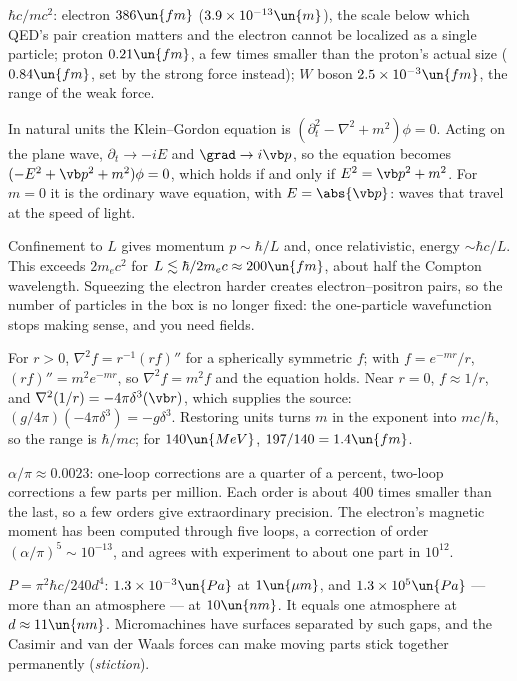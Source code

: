 
 $\hbar c/mc^2$: electron $386\un{fm}$ ($3.9\times10^{-13}\un{m}$), the scale below which QED's pair creation matters and the electron cannot be localized as a single particle; proton $0.21\un{fm}$, a few times smaller than the proton's actual size ($0.84\un{fm}$, set by the strong force instead); $W$ boson $2.5\times10^{-3}\un{fm}$, the range of the weak force.

 In natural units the Klein--Gordon equation is $(\partial_t^2 - \nabla^2 + m^2)\phi = 0$. Acting on the plane wave, $\partial_t\to-iE$ and $\grad\to i\vb p$, so the equation becomes $(-E^2 + \vb p^2 + m^2)\phi = 0$, which holds if and only if $E^2 = \vb p^2+m^2$. For $m = 0$ it is the ordinary wave equation, with $E = \abs{\vb p}$: waves that travel at the speed of light.

 Confinement to $L$ gives momentum $p\sim\hbar/L$ and, once relativistic, energy $\sim\hbar c/L$. This exceeds $2m_ec^2$ for $L\lesssim\hbar/2m_ec\approx200\un{fm}$, about half the Compton wavelength. Squeezing the electron harder creates electron--positron pairs, so the number of particles in the box is no longer fixed: the one-particle wavefunction stops making sense, and you need fields.

 For $r>0$, $\nabla^2f = r^{-1}(rf)''$ for a spherically symmetric $f$; with $f = e^{-mr}/r$, $(rf)'' = m^2e^{-mr}$, so $\nabla^2f = m^2f$ and the equation holds. Near $r = 0$, $f\approx1/r$, and $\nabla^2(1/r) = -4\pi\delta^3(\vb r)$, which supplies the source: $(g/4\pi)(-4\pi\delta^3) = -g\delta^3$. Restoring units turns $m$ in the exponent into $mc/\hbar$, so the range is $\hbar/mc$; for $140\un{MeV}$, $197/140 = 1.4\un{fm}$.

 $\alpha/\pi\approx0.0023$: one-loop corrections are a quarter of a percent, two-loop corrections a few parts per million. Each order is about $400$ times smaller than the last, so a few orders give extraordinary precision. The electron's magnetic moment has been computed through five loops, a correction of order $(\alpha/\pi)^5\sim10^{-13}$, and agrees with experiment to about one part in $10^{12}$.

 $P = \pi^2\hbar c/240d^4$: $1.3\times10^{-3}\un{Pa}$ at $1\un{\mu m}$, and $1.3\times10^{5}\un{Pa}$ --- more than an atmosphere --- at $10\un{nm}$. It equals one atmosphere at $d\approx11\un{nm}$. Micromachines have surfaces separated by such gaps, and the Casimir and van der Waals forces can make moving parts stick together permanently (\emph{stiction}).

